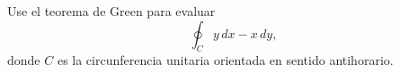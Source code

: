 Use el teorema de Green para evaluar
\[
\oint_C y\,dx-x\,dy,
\]
donde $C$ es la circunferencia unitaria orientada en sentido antihorario.
